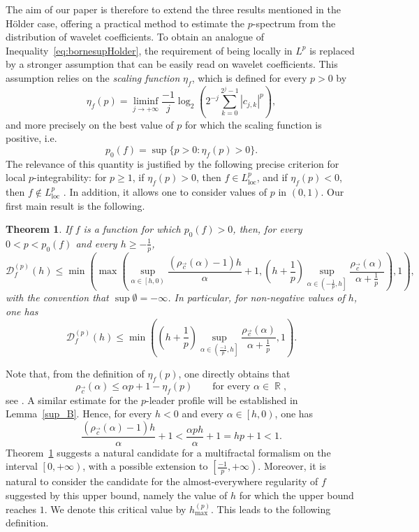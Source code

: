 \documentclass[a4paper,11pt,oneside]{article}
\DeclareMathOperator{\R}{\mathbb{R}}
\newcommand{\coint}[1]{\left[{#1}\right)}
\newcommand{\ooint}[1]{\left({#1}\right)}
\newcommand{\ocint}[1]{\left({#1}\right]}
\newcommand{\modu}[1]{\left\vert{#1}\right\vert}
\theoremstyle{definition}
\theoremstyle{plain}
\newtheorem{thm}[defi]{Theorem}
\begin{document}
The aim of our paper is therefore to extend the three results mentioned in the H\"older case, offering a practical method to estimate the $p$-spectrum from the distribution of wavelet coefficients. To obtain an analogue of Inequality~\eqref{eq:bornesupHolder}, the requirement of being locally in $L^p$ is replaced by a stronger assumption that can be easily read on wavelet coefficients. This assumption relies on the \textit{scaling function} $\eta_f$, which is defined for every $p>0$ by
\[
\eta_f(p)=\liminf_{j\rightarrow+\infty}\frac{-1}{j} \log_2\left(2^{-j}\displaystyle\sum_{k=0}^{2^j-1}\modu{c_{j,k}}^p\right),
\]
and more precisely on the best value of $p$ for which the scaling function is positive, i.e.
\begin{equation}\label{eq:p_0}
p_0(f)=\sup\{p>0:\eta_f(p)>0\}.
\end{equation}
The relevance of this quantity is justified by the following precise criterion for local $p$-integrability: for $p\geq1$, if $\eta_f(p)>0$, then $f\in L^p_{\text{loc}}$, and if $\eta_f(p)<0$, then $f\notin L^p_{\text{loc}}$ \cite{pexp1}. In addition, it allows one to consider values of $p$ in $\ooint{0,1}$. Our first main result is the following.

\begin{thm}\label{mainSup}
If $f$ is a function for which $p_0(f)>0$, then, for every $0<p<p_0(f)$ and every $h\geq -\frac{1}{p}$,
\[
    \mathscr{D}_f^{(p)}(h)\leq
    \min\left(
    \max\left(
    \sup_{\alpha\in\coint{h,0}}
    \frac{(\rho_{\vec{c}}(\alpha)-1)h}{\alpha}+1,
    \left(h+\frac{1}{p}\right)
    \sup_{\alpha\in\ocint{-\frac{1}{p},h}}
    \frac{\rho_{\vec{c}}(\alpha)}{\alpha+\frac{1}{p}}
    \right),1\right),
\]
with the convention that $\sup \emptyset=-\infty$. In particular, for non-negative values of $h$, one has 
\[
  \mathscr{D}_f^{(p)}(h)\leq \min\left(
\left(h+\frac{1}{p}\right)
\sup_{\alpha\in\ocint{\frac{-1}{p},h}}
\frac{\rho_{\vec{c}}(\alpha)}{\alpha+\frac{1}{p}},
1
\right).
\]
\end{thm}


Note that, from the definition of $\eta_f(p)$, one directly obtains that
\begin{equation}\label{eq:bound_rho}
    \rho_{\vec{c}}(\alpha) \leq \alpha p+1 -\eta_f(p)
\qquad \text{for every }\alpha\in\R,
\end{equation}
see \cite{RWS}. A similar estimate for the $p$-leader profile will be established in Lemma~\ref{sup_B}.
Hence, for every $h<0$ and every $\alpha\in\coint{h,0}$, one has
\[
\frac{(\rho_{\vec{c}}(\alpha)-1)h}{\alpha}+1
< \frac{\alpha ph}{\alpha}+1 = hp+1 < 1.
\]
Theorem~\ref{mainSup} suggests a natural candidate for a multifractal formalism on the interval $\coint{0,+\infty}$, with a possible extension to $\coint{\frac{-1}{p},+\infty}$. Moreover, it is natural to consider the candidate for the almost-everywhere regularity of $f$ suggested by this upper bound, namely the value of $h$ for which the upper bound reaches $1$. We denote this critical value by $h_{\max}^{(p)}$. This leads to the following definition.
\end{document}
